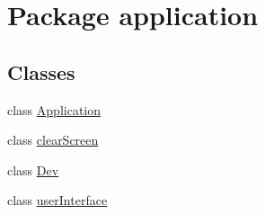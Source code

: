 \hypertarget{namespaceapplication}{}\section{Package application}
\label{namespaceapplication}
\subsection*{Classes}
\begin{DoxyCompactItemize}
\item 
class \mbox{\hyperlink{classapplication_1_1_application}{Application}}
\item 
class \mbox{\hyperlink{classapplication_1_1clear_screen}{clear\+Screen}}
\item 
class \mbox{\hyperlink{classapplication_1_1_dev}{Dev}}
\item 
class \mbox{\hyperlink{classapplication_1_1user_interface}{user\+Interface}}
\end{DoxyCompactItemize}
